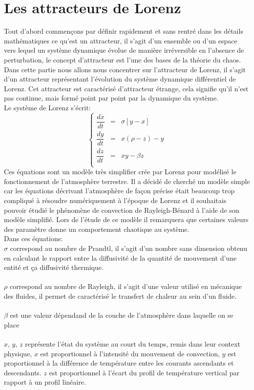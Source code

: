 \chapter{Les attracteurs de Lorenz}
Tout d’abord commençons par définir rapidement et sans rentré dans les détails mathématiques ce qu’est un attracteur,
 il s’agit d’un ensemble ou d’un espace vers lequel un système dynamique évolue de manière
 irréversible en l’absence de perturbation, le concept d’attracteur est l’une des bases de la théorie du chaos. 
 Dans cette partie nous allons nous concentrer sur l’attracteur de Lorenz, il s’agit d’un attracteur
représentant l’évolution du système dynamique différentiel de Lorenz. Cet attracteur est caractérisé d'attracteur étrange, cela signifie qu'il n'est pas continue, mais formé point par point par la dynamique du système.\\

Le système de Lorenz s'écrit: 
\[
    \left\{
    \begin{array}{rcl}
        \dfrac{dx}{dt}&=&\sigma[y-x]\\
        \dfrac{dy}{dt}&=&x(\rho-z)-y\\
        \dfrac{dz}{dt}&=&xy-\beta z\\
    \end{array}
    \right.
\]
Ces équations sont un modèle très simplifier crée par Lorenz pour modélisé le fonctionnement 
de l’atmosphère terrestre. Il a décidé de cherché un modèle simple car 
les équations décrivant l’atmosphère de façon précise était beaucoup trop compliqué à résoudre
 numériquement à l’époque de Lorenz et il souhaitais pouvoir étudié  le phénomène de convection
de Rayleigh-Bénard à l’aide de son modèle simplifié. Lors de l'étude de ce modèle il remarquera que certaines valeurs des paramètre donne un comportement
chaotique au système.\\


Dans ces équations: \\
$\sigma$  correspond au nombre de Prandtl, il s'agit d'un nombre sans dimension obtenu en calculant le rapport entre la diffusivité de la quantité de mouvement d'une entité et ça diffusivité thermique.\\\\
$\rho$    correspond au nombre de Rayleigh, il s'agit d'une valeur utilisé en mécanique des fluides, il permet de caractérisé le transfert de chaleur au sein d'un fluide. \\\\
$\beta $  est une valeur dépendand de la couche de l'atmosphère dans laquelle on se place\\\\
$x$, $y$, $z$ représente l'état du système au court du temps, remis dans leur context physique, $x$ est proportionnel à l'intensité du mouvement de convection, $y$ est proportionnel à la différence de température entre les courants ascendants et descendants. $z$ est proportionnel à l'écart du profil de température vertical par rapport à un profil linéaire.    

